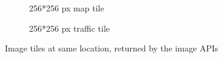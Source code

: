 \begin{figure}[th]
	\centering
	\begin{subfigure}[t]{0.45\columnwidth}
	\caption{256*256 px map tile}
	\label{fig:baidutile}
	\end{subfigure}
	\hfill
	\begin{subfigure}[t]{0.45\columnwidth}
	\caption{256*256 px traffic tile}
	\label{fig:baidutraffictile}
	\end{subfigure}
    \caption{Image tiles at same location, returned by the image APIs}
    \label{fig:imageapi}
\end{figure}

%
